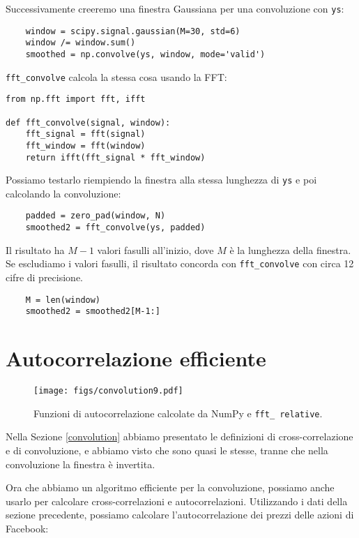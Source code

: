 \documentclass[12pt]{book} \usepackage[width=5.5in,height=8.5in, hmarginratio=3:2,vmarginratio=1:1]{geometry}
\begin{document}
Successivamente creeremo una finestra Gaussiana per una convoluzione con {\tt ys}:

\begin{verbatim} 
    window = scipy.signal.gaussian(M=30, std=6)
    window /= window.sum()
    smoothed = np.convolve(ys, window, mode='valid')
 \end{verbatim} 

\verb"fft_convolve" calcola la stessa cosa usando la FFT:

\begin{verbatim} 
from np.fft import fft, ifft

def fft_convolve(signal, window):
    fft_signal = fft(signal)
    fft_window = fft(window)
    return ifft(fft_signal * fft_window)
 \end{verbatim} 

Possiamo testarlo riempiendo la finestra alla stessa lunghezza di {\tt ys} e poi calcolando la convoluzione:

\begin{verbatim} 
    padded = zero_pad(window, N)
    smoothed2 = fft_convolve(ys, padded)
 \end{verbatim} 

Il risultato ha $M-1$ valori fasulli all'inizio, dove $M$ è la lunghezza della finestra. Se escludiamo i valori fasulli, il risultato concorda con \verb"fft_convolve" con circa 12 cifre di precisione.

\begin{verbatim} 
    M = len(window)
    smoothed2 = smoothed2[M-1:]
 \end{verbatim} 

\section{Autocorrelazione efficiente} 

\begin{figure} 

\centerline{\texttt{[image: figs/convolution9.pdf]}} \caption{Funzioni di autocorrelazione calcolate da NumPy e {\tt fft\_ relative}.} \label{fig.convolution9} \end{figure} 

Nella Sezione \ref{convolution} abbiamo presentato le definizioni di cross-correlazione e di convoluzione, e abbiamo visto che sono quasi le stesse, tranne che nella convoluzione la finestra è invertita.

Ora che abbiamo un algoritmo efficiente per la convoluzione, possiamo anche usarlo per calcolare cross-correlazioni e autocorrelazioni. Utilizzando i dati della sezione precedente, possiamo calcolare l'autocorrelazione dei prezzi delle azioni di Facebook:
\end{document}
